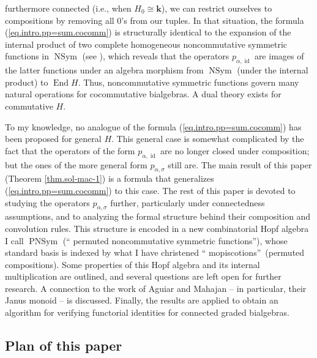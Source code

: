 \documentclass[numbers=enddot,12pt,final,onecolumn,notitlepage]{scrartcl}%
\theoremstyle{definition}
\begin{document}
furthermore connected (i.e., when $H_{0}\cong\mathbf{k}$), we can restrict
ourselves to compositions by removing all $0$'s from our tuples. In that
situation, the formula (\ref{eq.intro.pp=sum.cocomm}) is structurally
identical to the expansion of the internal product of two complete homogeneous
noncommutative symmetric functions in $\operatorname*{NSym}$ (see
\cite[Proposition 5.1]{ncsf1}), which reveals that the operators
$p_{\alpha,\operatorname*{id}}$ are images of the latter functions under an
algebra morphism from $\operatorname*{NSym}$ (under the internal product) to
$\operatorname*{End}H$. Thus, noncommutative symmetric functions govern many
natural operations for cocommutative bialgebras. A dual theory exists for
commutative $H$.

To my knowledge, no analogue of the formula (\ref{eq.intro.pp=sum.cocomm}) has
been proposed for general $H$. This general case is somewhat complicated by
the fact that the operators of the form $p_{\alpha,\operatorname*{id}}$ are no
longer closed under composition; but the ones of the more general form
$p_{\alpha,\sigma}$ still are. The main result of this paper (Theorem
\ref{thm.sol-mac-1}) is a formula that generalizes
(\ref{eq.intro.pp=sum.cocomm}) to this case. The rest of this paper is devoted
to studying the operators $p_{\alpha,\sigma}$ further, particularly under
connectedness assumptions, and to analyzing the formal structure behind their
composition and convolution rules. This structure is encoded in a new
combinatorial Hopf algebra I call $\operatorname*{PNSym}$ (\textquotedblleft
permuted noncommutative symmetric functions\textquotedblright), whose standard
basis is indexed by what I have christened \textquotedblleft
mopiscotions\textquotedblright\ (permuted compositions). Some properties of
this Hopf algebra and its internal multiplication are outlined, and several
questions are left open for further research. A connection to the work of
Aguiar and Mahajan -- in particular, their Janus monoid -- is discussed.
Finally, the results are applied to obtain an algorithm for verifying
functorial identities for connected graded bialgebras.

\subsection{Plan of this paper}
\end{document}
